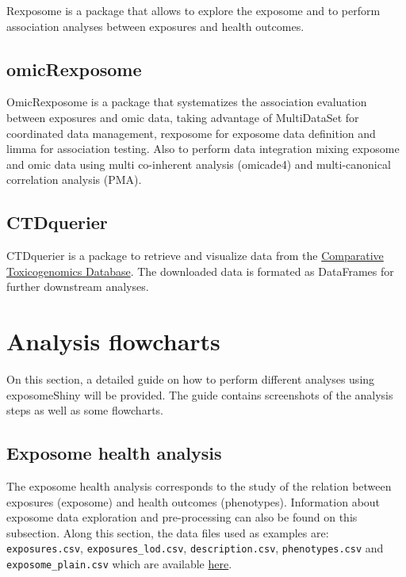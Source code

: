 \documentclass[
]{book}
\begin{document}
Rexposome is a package that allows to explore the exposome and to perform association analyses between exposures and health outcomes.

\hypertarget{omicrexposome}{%
\section{omicRexposome}\label{omicrexposome}}

OmicRexposome is a package that systematizes the association evaluation between exposures and omic data, taking advantage of MultiDataSet for coordinated data management, rexposome for exposome data definition and limma for association testing. Also to perform data integration mixing exposome and omic data using multi co-inherent analysis (omicade4) and multi-canonical correlation analysis (PMA).

\hypertarget{ctdquerier}{%
\section{CTDquerier}\label{ctdquerier}}

CTDquerier is a package to retrieve and visualize data from the \href{http://ctdbase.org/}{Comparative Toxicogenomics Database}. The downloaded data is formated as DataFrames for further downstream analyses.

\hypertarget{analysis-flowcharts}{%
\chapter{Analysis flowcharts}\label{analysis-flowcharts}}

On this section, a detailed guide on how to perform different analyses using exposomeShiny will be provided. The guide contains screenshots of the analysis steps as well as some flowcharts.

\hypertarget{exposome-health-analysis}{%
\section{Exposome health analysis}\label{exposome-health-analysis}}

The exposome health analysis corresponds to the study of the relation between exposures (exposome) and health outcomes (phenotypes). Information about exposome data exploration and pre-processing can also be found on this subsection. Along this section, the data files used as examples are: \texttt{exposures.csv}, \texttt{exposures\_lod.csv}, \texttt{description.csv}, \texttt{phenotypes.csv} and \texttt{exposome\_plain.csv} which are available \href{https://github.com/isglobal-brge/exposomeShiny/tree/master/data}{here}.
\end{document}

